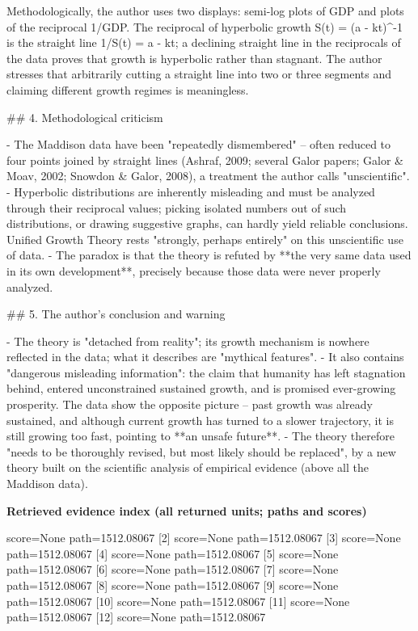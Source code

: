 \documentclass[10pt]{article}
\begin{document}
\begin{AnswerText}
Methodologically, the author uses two displays: semi-log plots of GDP and plots of the reciprocal 1/GDP. The reciprocal of hyperbolic growth S(t) = (a - kt)^-1 is the straight line 1/S(t) = a - kt; a declining straight line in the reciprocals of the data proves that growth is hyperbolic rather than stagnant. The author stresses that arbitrarily cutting a straight line into two or three segments and claiming different growth regimes is meaningless.

## 4. Methodological criticism

- The Maddison data have been "repeatedly dismembered" -- often reduced to four points joined by straight lines (Ashraf, 2009; several Galor papers; Galor & Moav, 2002; Snowdon & Galor, 2008), a treatment the author calls "unscientific".
- Hyperbolic distributions are inherently misleading and must be analyzed through their reciprocal values; picking isolated numbers out of such distributions, or drawing suggestive graphs, can hardly yield reliable conclusions. Unified Growth Theory rests "strongly, perhaps entirely" on this unscientific use of data.
- The paradox is that the theory is refuted by **the very same data used in its own development**, precisely because those data were never properly analyzed.

## 5. The author's conclusion and warning

- The theory is "detached from reality"; its growth mechanism is nowhere reflected in the data; what it describes are "mythical features".
- It also contains "dangerous misleading information": the claim that humanity has left stagnation behind, entered unconstrained sustained growth, and is promised ever-growing prosperity. The data show the opposite picture -- past growth was already sustained, and although current growth has turned to a slower trajectory, it is still growing too fast, pointing to **an unsafe future**.
- The theory therefore "needs to be thoroughly revised, but most likely should be replaced", by a new theory built on the scientific analysis of empirical evidence (above all the Maddison data).
\end{AnswerText}

\textbf{Retrieved evidence index (all returned units; paths and scores) }
\begin{EvidenceText}
[1] score=None path=1512.08067
[2] score=None path=1512.08067
[3] score=None path=1512.08067
[4] score=None path=1512.08067
[5] score=None path=1512.08067
[6] score=None path=1512.08067
[7] score=None path=1512.08067
[8] score=None path=1512.08067
[9] score=None path=1512.08067
[10] score=None path=1512.08067
[11] score=None path=1512.08067
[12] score=None path=1512.08067
\end{EvidenceText}
\end{document}

